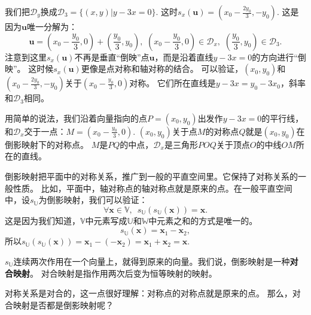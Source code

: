 \documentclass[12pt,UTF8,fontset=none]{ctexbook}
\begin{document}
我们把$\mathcal{D}_y$换成$\mathcal{D}_{3} = \{(x, y) | y - 3x = 0\}.$
这时$s_x(\mathbf{u}) = (x_0-\frac{2y_0}{3},-y_0)$.
这是因为$\mathbf{u}$唯一分解为：
$$\mathbf{u} = (x_0-\frac{y_0}{3},0) + (\frac{y_0}{3},y_0), \,\,(x_0-\frac{y_0}{3},0)\in\mathcal{D}_x,\,\,(\frac{y_0}{3},y_0)\in\mathcal{D}_3.$$
注意到这里$s_x(\mathbf{u})$不再是垂直“倒映”点$\mathbf{u}$，而是沿着直线$y - 3x = 0$的方向进行“倒映”。
这时候$s_x(\mathbf{u})$更像是点对称和轴对称的结合。
可以验证，$(x_0,y_0)$和$(x_0-\frac{2y_0}{3},-y_0)$关于$(x_0-\frac{y_0}{3},0)$对称。
它们所在直线是$y - 3x = y_0 - 3x_0$，斜率和$\mathcal{D}_{3}$相同。

用简单的说法，我们沿着向量指向的点$P = (x_0, y_0)$出发作$y - 3x = 0$的平行线，
和$\mathcal{D}_x$交于一点：$M = (x_0-\frac{y_0}{3},0).$
$(x_0, y_0)$关于点$M$的对称点$Q$就是$(x_0, y_0)$在倒影映射下的对称点。
$M$是$PQ$的中点，$\mathcal{D}_x$是三角形$POQ$关于顶点$O$的中线$OM$所在的直线。

倒影映射把平面中的对称关系，推广到一般的平直空间里。它保持了对称关系的一般性质。
比如，平面中，轴对称点的轴对称点就是原来的点。在一般平直空间中，设$s_{\mathbb{U}}$为倒影映射，我们可以验证：
$$ \forall \mathbf{x} \in \mathbb{V},\,\,\,s_{\mathbb{U}}(s_{\mathbb{U}}(\mathbf{x})) = \mathbf{x}.$$
这是因为我们知道，$\mathbb{V}$中元素写成$\mathbb{U}$和$\mathbb{W}$中元素之和的方式是唯一的。
$$s_{\mathbb{U}}(\mathbf{x}) = \mathbf{x}_1 - \mathbf{x}_2,$$
所以$s_{\mathbb{U}}(s_{\mathbb{U}}(\mathbf{x})) = \mathbf{x}_1 - (- \mathbf{x}_2) =  \mathbf{x}_1 + \mathbf{x}_2 = \mathbf{x}.$

$s_{\mathbb{U}}$连续两次作用在一个向量上，就得到原来的向量。我们说，倒影映射是一种\textbf{对合映射}。
对合映射是指作用两次后变为恒等映射的映射。

对称关系是对合的，这一点很好理解：对称点的对称点就是原来的点。
那么，对合映射是否都是倒影映射呢？
\end{document}
